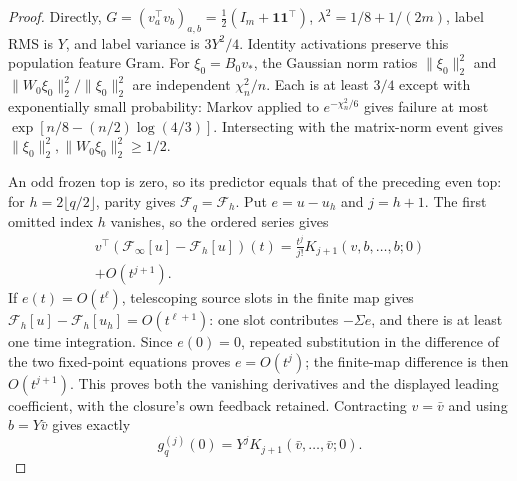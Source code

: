 \label{cp:nth:proof:omitted-derivative}{}

\begin{proof}
Directly,
\(G=(v_a^\top v_b)_{a,b}=\frac12(I_m+\mathbf1\mathbf1^\top)\),
\(\lambda^2=1/8+1/(2m)\), label RMS is \(Y\), and label variance is
\(3Y^2/4\). Identity activations preserve this population feature Gram.
For \(\xi_0=B_0v_*\), the Gaussian norm ratios \(\|\xi_0\|_2^2\) and
\(\|W_0\xi_0\|_2^2/\|\xi_0\|_2^2\) are independent \(\chi_n^2/n\). Each
is at least \(3/4\) except with exponentially small probability: Markov
applied to \(e^{-\chi_n^2/6}\) gives failure at most
\(\exp[n/8-(n/2)\log(4/3)]\). Intersecting with the matrix-norm event
gives \(\|\xi_0\|_2^2,\|W_0\xi_0\|_2^2\ge1/2\).

An odd frozen top is zero, so its predictor equals that of the preceding
even top: for \(h=2\lfloor q/2\rfloor\), parity gives
\(\mathcal F_q=\mathcal F_h\). Put \(e=u-u_h\) and \(j=h+1\). The first
omitted index \(h\) vanishes, so the ordered series gives
\[\begin{gathered}
v^\top(\mathcal F_\infty[u]-\mathcal F_h[u])(t)
=\frac{t^j}{j!}K_{j+1}(v,b,\ldots,b;0)\\+O(t^{j+1}).
\end{gathered}\] If \(e(t)=O(t^\ell)\), telescoping source slots in the
finite map gives \(\mathcal F_h[u]-\mathcal F_h[u_h]=O(t^{\ell+1})\):
one slot contributes \(-\Sigma e\), and there is at least one time
integration. Since \(e(0)=0\), repeated substitution in the difference
of the two fixed-point equations proves \(e=O(t^j)\); the finite-map
difference is then \(O(t^{j+1})\). This proves both the vanishing
derivatives and the displayed leading coefficient, with the closure's
own feedback retained. Contracting \(v=\bar v\) and using \(b=Y\bar v\)
gives exactly
\begin{equation}\label{cp:nth:eq:feedback-jet}{
g_q^{(j)}(0)=Y^j K_{j+1}(\bar v,\ldots,\bar v;0).
}\end{equation}


\end{proof}
